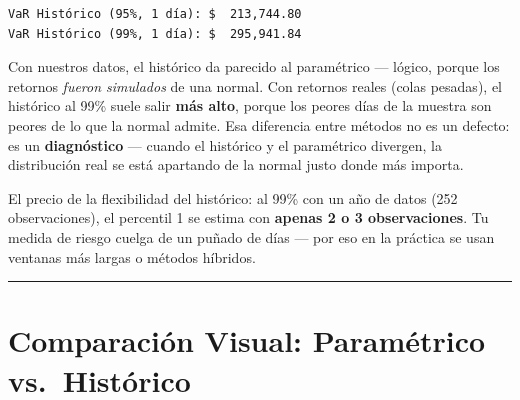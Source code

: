 \documentclass[
  spanish,
  letterpaper,
  DIV=11,
  numbers=noendperiod]{scrreprt}
\begin{document}
\begin{verbatim}
VaR Histórico (95%, 1 día): $  213,744.80
VaR Histórico (99%, 1 día): $  295,941.84
\end{verbatim}

Con nuestros datos, el histórico da parecido al paramétrico --- lógico,
porque los retornos \emph{fueron simulados} de una normal. Con retornos
reales (colas pesadas), el histórico al 99\% suele salir \textbf{más
alto}, porque los peores días de la muestra son peores de lo que la
normal admite. Esa diferencia entre métodos no es un defecto: es un
\textbf{diagnóstico} --- cuando el histórico y el paramétrico divergen,
la distribución real se está apartando de la normal justo donde más
importa.

El precio de la flexibilidad del histórico: al 99\% con un año de datos
(252 observaciones), el percentil 1 se estima con \textbf{apenas 2 o 3
observaciones}. Tu medida de riesgo cuelga de un puñado de días --- por
eso en la práctica se usan ventanas más largas o métodos híbridos.

\begin{center}\rule{0.5\linewidth}{0.5pt}\end{center}

\chapter{Comparación Visual: Paramétrico
vs.~Histórico}\label{comparaciuxf3n-visual-paramuxe9trico-vs.-histuxf3rico}
\end{document}
